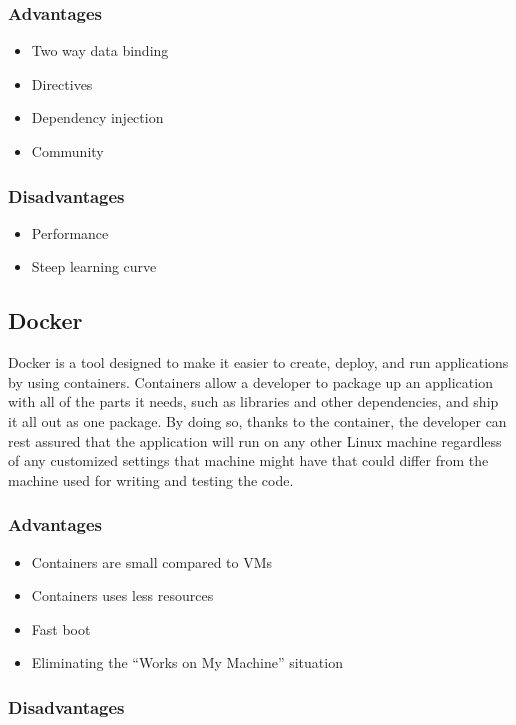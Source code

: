 \documentclass[a4paper, hidelinks, 12pt]{report}
\begin{document}
\subsubsection{Advantages}
\begin{itemize}
\item{} Two way data binding
\item{} Directives
\item{} Dependency injection
\item{} Community
\end{itemize}
\subsubsection{Disadvantages}
\begin{itemize}
\item{} Performance
\item{} Steep learning curve

\end{itemize}

	
\subsection{Docker}
Docker is a tool designed to make it easier to create, deploy, and run applications by using containers. Containers allow a developer to package up an application with all of the parts it needs, such as libraries and other dependencies, and ship it all out as one package. By doing so, thanks to the container, the developer can rest assured that the application will run on any other Linux machine regardless of any customized settings that machine might have that could differ from the machine used for writing and testing the code.

\subsubsection{Advantages}

\begin{itemize}
\item{} Containers are small compared to VMs
\item{} Containers uses less resources
\item{} Fast boot
\item{} Eliminating the “Works on My Machine” situation

\end{itemize}
\subsubsection{Disadvantages}
\end{document}
